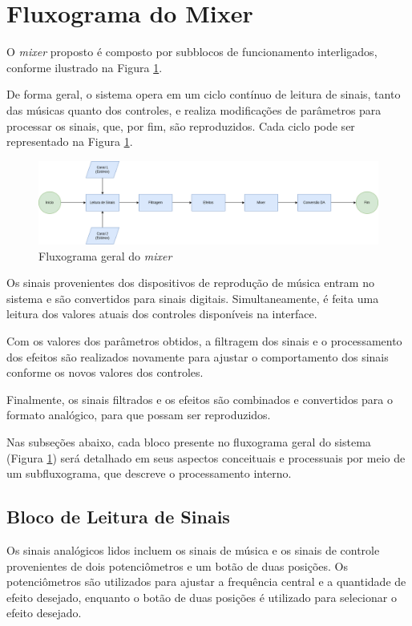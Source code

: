 \section{Fluxograma do Mixer}

O \textit{mixer} proposto é composto por subblocos de funcionamento interligados, conforme ilustrado na Figura \ref{fig52}.

De forma geral, o sistema opera em um ciclo contínuo de leitura de sinais, tanto das músicas quanto dos controles, e realiza modificações de parâmetros para processar os sinais, que, por fim, são reproduzidos. Cada ciclo pode ser representado na Figura \ref{fig52}.

\begin{figure}[h]
    \centering
    \includegraphics[width=\textwidth]{figuras/fig52.png}
    \caption{Fluxograma geral do \textit{mixer}}
    \label{fig52}
\end{figure}

Os sinais provenientes dos dispositivos de reprodução de música entram no sistema e são convertidos para sinais digitais. Simultaneamente, é feita uma leitura dos valores atuais dos controles disponíveis na interface.

Com os valores dos parâmetros obtidos, a filtragem dos sinais e o processamento dos efeitos são realizados novamente para ajustar o comportamento dos sinais conforme os novos valores dos controles.

Finalmente, os sinais filtrados e os efeitos são combinados e convertidos para o formato analógico, para que possam ser reproduzidos.

Nas subseções abaixo, cada bloco presente no fluxograma geral do sistema (Figura \ref{fig52}) será detalhado em seus aspectos conceituais e processuais por meio de um subfluxograma, que descreve o processamento interno.

\subsection{Bloco de Leitura de Sinais}

Os sinais analógicos lidos incluem os sinais de música e os sinais de controle provenientes de dois potenciômetros e um botão de duas posições. Os potenciômetros são utilizados para ajustar a frequência central e a quantidade de efeito desejado, enquanto o botão de duas posições é utilizado para selecionar o efeito desejado.

